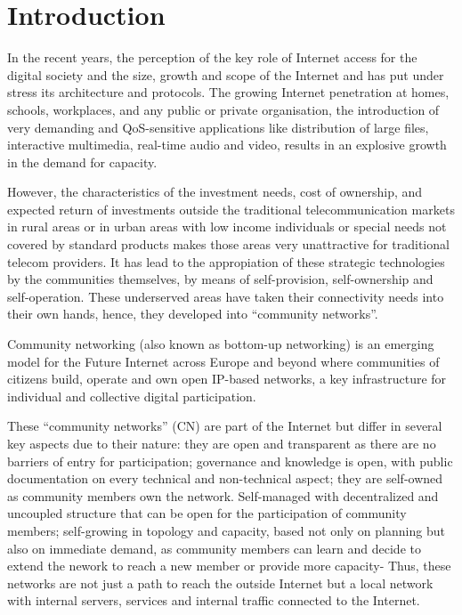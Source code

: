 \documentclass[conference]{IEEEtran}
\begin{document}
\section{Introduction}

In the recent years, the perception of the key role of Internet access for the
digital society and the size, growth and scope of the Internet and has put under stress
its architecture and protocols. The growing Internet penetration at homes, schools,
workplaces, and any public or private organisation, the introduction of very demanding
and QoS-sensitive applications like distribution of large files, interactive multimedia,
real-time audio and video, results in an explosive growth in the demand for capacity.

However, the characteristics of the investment needs, cost of ownership, and expected return
of investments outside the traditional telecommunication markets in rural areas or in 
urban areas with low income individuals or special needs not covered by standard products
makes those areas very unattractive for traditional telecom providers. It has lead to the
appropiation of these strategic technologies by the communities themselves, by means of
self-provision, self-ownership and self-operation. These underserved areas have taken their
connectivity needs into their own hands, hence, they developed into ``community networks''.

Community networking (also known as bottom-up networking) is an emerging model 
for the Future Internet across Europe and beyond where communities
of citizens build, operate and own open IP-based networks, a key infrastructure
for individual and collective digital participation.

These ``community networks'' (CN) are part of the Internet but differ in several key
aspects due to their nature: they are open and transparent as there are no barriers of entry
for participation; governance and knowledge is open, with public documentation on
every technical and non-technical aspect; they are self-owned as community members
own the network. Self-managed with decentralized and uncoupled structure that can be open
for the participation of community members; self-growing in topology and capacity, based not only
on planning but also on immediate demand, as community members can learn and decide to extend the nework
to reach a new member or provide more capacity- Thus, these networks are not just
a path to reach the outside Internet but a local network with internal servers, services and
internal traffic connected to the Internet.
\end{document}
